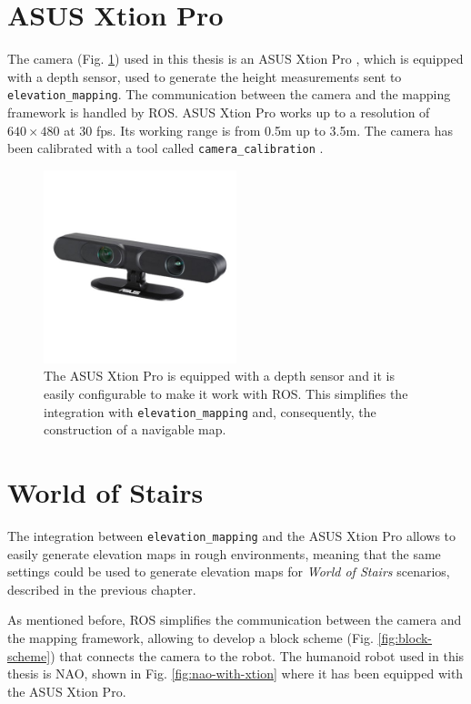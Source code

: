 \section{ASUS Xtion Pro}
The camera (Fig. \ref{fig:asus-xtion-pro}) used in this thesis is an
ASUS Xtion Pro \cite{ASUSXtionProWebsite},
which is equipped with a depth sensor, used to generate the height measurements
sent to \texttt{elevation\_mapping}. The communication between the camera and 
the mapping framework is handled by ROS.
ASUS Xtion Pro works up to a resolution of $640\times480$
at 30 fps. Its working range is from 0.5m up to 3.5m. The camera has been 
calibrated with a tool called \texttt{camera\_calibration}
\cite{cameracalibrationros}.
\begin{figure}
  \centering
  \includegraphics[width=0.5\textwidth]{figures/asus-xtion-pro.jpeg}
  \caption{The ASUS Xtion Pro \cite{ASUSXtionProWebsite} is equipped with a
      depth sensor and it is 
      easily configurable to make it work with ROS. This simplifies the 
      integration with \texttt{elevation\_mapping} and, consequently, 
      the construction of a navigable map.}
  \label{fig:asus-xtion-pro}
\end{figure}

\section{World of Stairs}
The integration between \texttt{elevation\_mapping} and the ASUS Xtion Pro 
allows to easily generate elevation maps in rough environments, meaning that 
the same settings could be used to generate elevation maps for \textit{World 
of Stairs} scenarios, described in the previous chapter.

As mentioned before, ROS simplifies the communication between the camera and 
the mapping framework, allowing to develop a block scheme (Fig.
\ref{fig:block-scheme}) that connects the camera to the robot. The humanoid 
robot used in this thesis is NAO, shown in Fig. \ref{fig:nao-with-xtion}
where it has been equipped with the ASUS Xtion Pro.


